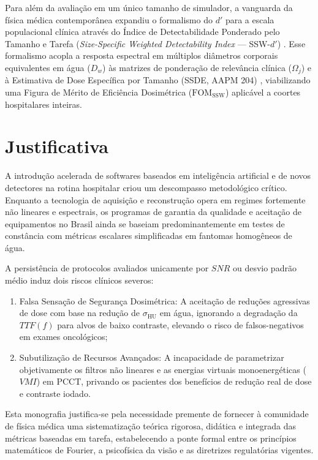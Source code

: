 \documentclass[
  12pt,
  a4paper,
  oneside
]{report}
\begin{document}
Para além da avaliação em um único tamanho de simulador, a vanguarda da física médica contemporânea expandiu o formalismo do $d'$ para a escala populacional clínica através do Índice de Detectabilidade Ponderado pelo Tamanho e Tarefa (\emph{Size-Specific Weighted Detectability Index} --- SSW-$d'$) \cite{fitton2026, goppel2021}. Esse formalismo acopla a resposta espectral em múltiplos diâmetros corporais equivalentes em água ($D_w$) às matrizes de ponderação de relevância clínica ($\Omega_j$) e à Estimativa de Dose Específica por Tamanho (SSDE, AAPM 204) \cite{aapm_report204}, viabilizando uma Figura de Mérito de Eficiência Dosimétrica ($\text{FOM}_{\text{SSW}}$) aplicável a coortes hospitalares inteiras.

\section{Justificativa}
\label{sec:justificativa_problema}

A introdução acelerada de softwares baseados em inteligência artificial e de novos detectores na rotina hospitalar criou um descompasso metodológico crítico. Enquanto a tecnologia de aquisição e reconstrução opera em regimes fortemente não lineares e espectrais, os programas de garantia da qualidade e aceitação de equipamentos no Brasil ainda se baseiam predominantemente em testes de constância com métricas escalares simplificadas em fantomas homogêneos de água.

A persistência de protocolos avaliados unicamente por $SNR$ ou desvio padrão médio induz dois riscos clínicos severos:
\begin{enumerate}
  \item Falsa Sensação de Segurança Dosimétrica: A aceitação de reduções agressivas de dose com base na redução de $\sigma_{\text{HU}}$ em água, ignorando a degradação da $TTF(f)$ para alvos de baixo contraste, elevando o risco de falsos-negativos em exames oncológicos;
  \item Subutilização de Recursos Avançados: A incapacidade de parametrizar objetivamente os filtros não lineares e as energias virtuais monoenergéticas ($VMI$) em PCCT, privando os pacientes dos benefícios de redução real de dose e contraste iodado.
\end{enumerate}

Esta monografia justifica-se pela necessidade premente de fornecer à comunidade de física médica uma sistematização teórica rigorosa, didática e integrada das métricas baseadas em tarefa, estabelecendo a ponte formal entre os princípios matemáticos de Fourier, a psicofísica da visão e as diretrizes regulatórias vigentes.
\end{document}
